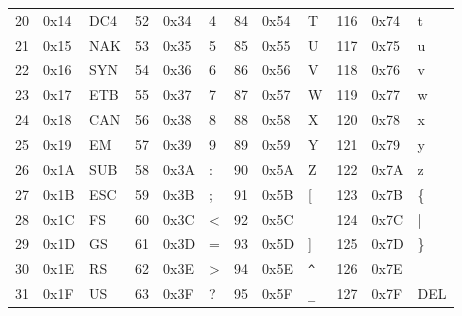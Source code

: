 \documentclass{book}
\begin{document}
{\begin{tabular}{|lll|lll|lll|lll|}
   20 &  0x14 &  DC4 &   52 &  0x34 &    4 &   84 &  0x54 &    T &  116 &  0x74 &    t \\
   21 &  0x15 &  NAK &   53 &  0x35 &    5 &   85 &  0x55 &    U &  117 &  0x75 &    u \\
   22 &  0x16 &  SYN &   54 &  0x36 &    6 &   86 &  0x56 &    V &  118 &  0x76 &    v \\
   23 &  0x17 &  ETB &   55 &  0x37 &    7 &   87 &  0x57 &    W &  119 &  0x77 &    w \\
   24 &  0x18 &  CAN &   56 &  0x38 &    8 &   88 &  0x58 &    X &  120 &  0x78 &    x \\
   25 &  0x19 &   EM &   57 &  0x39 &    9 &   89 &  0x59 &    Y &  121 &  0x79 &    y \\
   26 &  0x1A &  SUB &   58 &  0x3A &    : &   90 &  0x5A &    Z &  122 &  0x7A &    z \\
   27 &  0x1B &  ESC &   59 &  0x3B &    ; &   91 &  0x5B &    [ &  123 &  0x7B &   \{ \\
   28 &  0x1C &   FS &   60 &  0x3C &    < &   92 &  0x5C &    \ &  124 &  0x7C &    | \\
   29 &  0x1D &   GS &   61 &  0x3D &    = &   93 &  0x5D &    ] &  125 &  0x7D &   \} \\
   30 &  0x1E &   RS &   62 &  0x3E &    > &   94 &  0x5E & \verb|^| &  126 &  0x7E &    ~ \\
   31 &  0x1F &   US &   63 &  0x3F &    ? &   95 &  0x5F & \verb|_| &  127 &  0x7F & DEL \\

\end{tabular}

}
\end{document}
